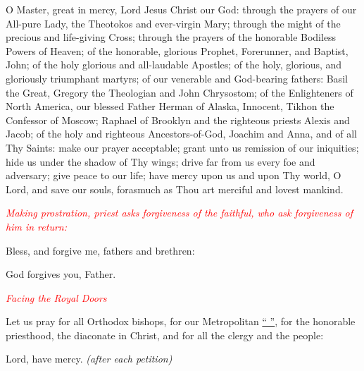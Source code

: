 \begin{hang}
\noindent{}O Master, great in mercy, Lord Jesus Christ 
our God: through the prayers of our All-pure Lady, the Theotokos and 
ever-virgin Mary; through the might of the precious and life-giving Cross; 
through the prayers of the honorable Bodiless Powers of Heaven; of the 
honorable, glorious Prophet, Forerunner, and Baptist, John; of the holy 
glorious and all-laudable Apostles; of the holy, glorious, and gloriously 
triumphant martyrs; of our venerable and God-bearing fathers: Basil the Great, 
Gregory the Theologian and John Chrysostom; of the Enlighteners of North 
America, our blessed Father Herman of Alaska, Innocent, Tikhon the Confessor of 
Moscow; Raphael of Brooklyn and the righteous priests Alexis and Jacob; of the 
holy and righteous Ancestors-of-God, Joachim and Anna, and of all Thy Saints: 
make our prayer acceptable;  grant unto us remission of our iniquities;  hide 
us under the shadow of Thy wings;  drive far from us every foe and adversary; 
give peace to our life;  have mercy upon us and upon Thy world, O Lord, and 
save our souls, forasmuch as Thou art merciful and lovest mankind.

\end{hang}
\noindent
\textcolor{red}{\textit{Making prostration, priest asks forgiveness of the 
faithful, who ask forgiveness of him in return:}}

\noindent{}Bless, and forgive me, fathers and brethren:

\noindent{}God forgives you, Father.

\noindent
\textcolor{red}{\textit{Facing the Royal Doors}}

\begin{hang}
\noindent{}Let us pray for all Orthodox bishops, for 
our Metropolitan \underline{``          ''}, for the honorable priesthood, the 
diaconate in Christ, and for all the clergy and the people:

\end{hang}

\noindent{}Lord, have mercy. \textit{(after each 
petition)}

